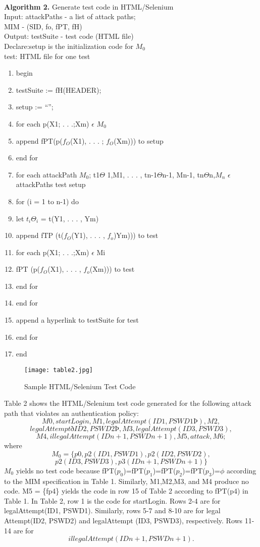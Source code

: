 \paragraph{} \textbf{Algorithm 2.} Generate test code in HTML/Selenium
\\Input: attackPaths - a list of attack paths;
\\MIM - (SID, fo, fPT, fH)
\\Output: testSuite - test code (HTML file)
\\Declare:setup is the initialization code for $M_0$
\\test: HTML file for one test
\begin{enumerate}
\item begin
\item testSuite := fH(HEADER);
\item setup := “”;
\item for each p(X1; . . .;Xm) $\epsilon$ $M_0$
\item append fPT(p($f_O$(X1), . . . ; $f_O$(Xm))) to setup
\item end for
\item for each attackPath $M_0$; t1$\Theta$ 1,M1, . . . , tn-1$\Theta$n-1, Mn-1, tn$\Theta$n,$M_n$ $\epsilon$ attackPaths
test setup
\item for (i = 1 to n-1) do
\item let $t_i\Theta_i$ = t(Y1, . . . , Ym)
\item append fTP (t($f_O$(Y1), . . . , $f_o$)Ym))) to test
\item for each p(X1; . . .;Xm) $\epsilon$ Mi
\item fPT (p($f_O$(X1), . . . , $f_o$(Xm))) to test
\item end for
\item end for
\item append a hyperlink to testSuite for test
\item end for
\item end
\end{enumerate}
\begin{figure}
\centering
\texttt{[image: table2.jpg]}
\caption{Sample HTML/Selenium Test Code}
\label{fig:TABLE2}
\end{figure}

Table 2 shows the HTML/Selenium test code generated
for the following attack path that violates an authentication
policy:
$$
M0,startLogin,M1,legalAttempt(ID1,PSWD1Þ),M2,$$
$$legalAttemptðID2,PSWD2Þ,M3,legalAttempt(ID3, PSWD3),$$
$$M4,illegalAttempt(IDn+1,PSWDn+1),M5, attack,M6;
$$
where
$$M_0 = \{ p0, p2(ID1,PSWD1),p2(ID2,PSWD2),$$$$p2(ID3,PSWD3),p3(IDn+1,PSWDn+1)\}$$
$M_0$ yields no test code because fPT($p_0$)=fPT($p_1$)=fPT($p_2$)=fPT($p_3$)=$\phi$ according to the MIM specification in Table 1. Similarly, M1,M2,M3, and M4 produce no code. M5 = \{fp4\} yields the code in row 15 of Table 2 according to fPT(p4) in
Table 1. In Table 2, row 1 is the code for startLogin. Rows 2-4 are for legalAttempt(ID1, PSWD1). Similarly, rows 5-7 and 8-10 are for legal Attempt(ID2, PSWD2) and legalAttempt (ID3, PSWD3), respectively. Rows 11-14 are for $$illegalAttempt(IDn+1,PSWDn+1).$$

